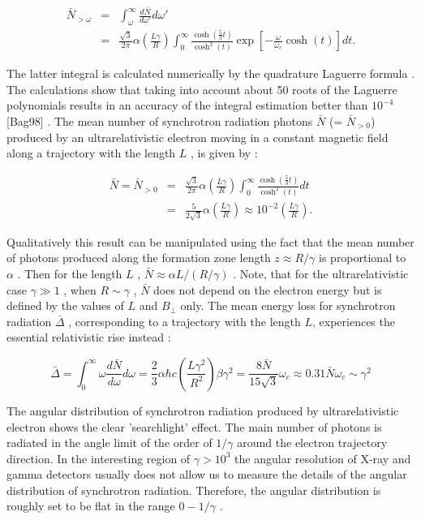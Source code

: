 \begin{eqnarray}
\bar{N}_{>\omega}& = &
\int_{\omega}^{\infty}\frac{d\bar{N}}{d\omega'}d\omega' \nonumber\\
& = &
\frac{\sqrt{3}}{2\pi}\alpha\left(\frac{L\gamma}{R}\right)
\int_0^{\infty}\frac{\cosh\left(\frac{5}{3}t\right)}{\cosh^2(t)}
\exp\left[-\frac{\omega}{\omega_c}\cosh(t)\right]dt .
\end{eqnarray}

The latter integral is calculated numerically by the quadrature Laguerre 
formula \cite{korn} . The calculations show that taking into account 
about 50 roots of 
the Laguerre polynomials results in an accuracy of the integral estimation 
better than $10^{-4}$ [Bag98] . The mean number of synchrotron radiation photons
$\bar{N}$  (= $\bar{N}_{>0}$) produced by an ultrarelativistic electron 
moving in a constant magnetic field along a trajectory with the length $L$
  , is given by :

\begin{eqnarray}
\bar{N} = \bar{N}_{>0}& = & 
\frac{\sqrt{3}}{2\pi}\alpha\left(\frac{L\gamma}{R}\right)
\int_0^{\infty}\frac{\cosh\left(\frac{5}{3}t\right)}{\cosh^2(t)}dt \nonumber\\
& = &
\frac{5}{2\sqrt{3}}\alpha\left(\frac{L\gamma}{R}\right) \approx 
10^{-2}\left(\frac{L\gamma}{R}\right) .
\end{eqnarray}

Qualitatively this result can be manipulated using the fact that the mean 
number of photons produced along the formation zone length 
$z \approx R/\gamma$  is proportional to $\alpha$  .
 Then for the length $L$ , $\bar{N} \approx \alpha L/(R/\gamma)$ . Note, that 
for the ultrarelativistic case $\gamma\gg1$   , when $R \sim \gamma$ , 
$\bar{N}$ does not depend on the electron energy but is defined by the 
values of $L$ and $B_{\bot}$ only. The mean energy loss for synchrotron 
radiation $\bar\Delta$ , corresponding to a trajectory with the length $L$, 
experiences the essential relativistic rise instead :

\begin{equation}
\bar{\Delta} = \int_0^{\infty}\omega\frac{d\bar{N}}{d\omega}d\omega =
\frac{2}{3}\alpha\hbar c\left(\frac{L\gamma^2}{R^2}\right)\beta\gamma^2 =   
\frac{8\bar{N}}{15\sqrt{3}}\omega_{c} 
\approx 0.31\bar{N}\omega_{c} \sim \gamma^2
\end{equation}

The angular distribution of synchrotron radiation produced by ultrarelativistic 
electron shows the clear 'searchlight' effect. The main number of photons is 
radiated in the angle limit of the order of $1/\gamma$   around the electron 
trajectory direction. In the interesting region of $\gamma > 10^3$ 
the angular resolution of 
X-ray and gamma detectors usually does not allow us to measure the details 
of the angular distribution of synchrotron radiation. Therefore, the angular 
distribution is roughly set to be flat in the range $0 - 1/\gamma$ .

